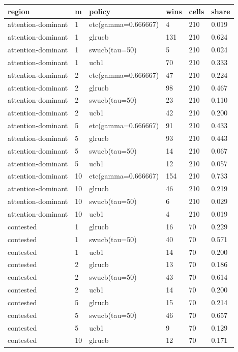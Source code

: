 \begin{tabular}{llllll}
\toprule
region & m & policy & wins & cells & share \\
\midrule
attention-dominant & 1 & etc(gamma=0.666667) & 4 & 210 & 0.019 \\
attention-dominant & 1 & glrucb & 131 & 210 & 0.624 \\
attention-dominant & 1 & swucb(tau=50) & 5 & 210 & 0.024 \\
attention-dominant & 1 & ucb1 & 70 & 210 & 0.333 \\
attention-dominant & 2 & etc(gamma=0.666667) & 47 & 210 & 0.224 \\
attention-dominant & 2 & glrucb & 98 & 210 & 0.467 \\
attention-dominant & 2 & swucb(tau=50) & 23 & 210 & 0.110 \\
attention-dominant & 2 & ucb1 & 42 & 210 & 0.200 \\
attention-dominant & 5 & etc(gamma=0.666667) & 91 & 210 & 0.433 \\
attention-dominant & 5 & glrucb & 93 & 210 & 0.443 \\
attention-dominant & 5 & swucb(tau=50) & 14 & 210 & 0.067 \\
attention-dominant & 5 & ucb1 & 12 & 210 & 0.057 \\
attention-dominant & 10 & etc(gamma=0.666667) & 154 & 210 & 0.733 \\
attention-dominant & 10 & glrucb & 46 & 210 & 0.219 \\
attention-dominant & 10 & swucb(tau=50) & 6 & 210 & 0.029 \\
attention-dominant & 10 & ucb1 & 4 & 210 & 0.019 \\
contested & 1 & glrucb & 16 & 70 & 0.229 \\
contested & 1 & swucb(tau=50) & 40 & 70 & 0.571 \\
contested & 1 & ucb1 & 14 & 70 & 0.200 \\
contested & 2 & glrucb & 13 & 70 & 0.186 \\
contested & 2 & swucb(tau=50) & 43 & 70 & 0.614 \\
contested & 2 & ucb1 & 14 & 70 & 0.200 \\
contested & 5 & glrucb & 15 & 70 & 0.214 \\
contested & 5 & swucb(tau=50) & 46 & 70 & 0.657 \\
contested & 5 & ucb1 & 9 & 70 & 0.129 \\
contested & 10 & glrucb & 12 & 70 & 0.171 \\

\end{tabular}
